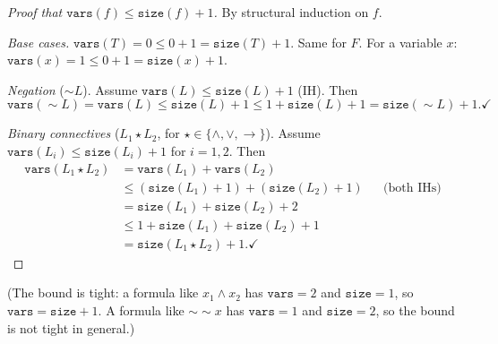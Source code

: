 \documentclass[11pt]{article}
\begin{document}
\begin{proof}[Proof that $\texttt{vars}(f) \leq \texttt{size}(f) + 1$]
By structural induction on $f$.

\emph{Base cases.} $\texttt{vars}(T) = 0 \leq 0 + 1 = \texttt{size}(T) + 1$. Same for $F$. For a variable $x$: $\texttt{vars}(x) = 1 \leq 0 + 1 = \texttt{size}(x) + 1$. \checkmark

\emph{Negation} (${\sim} L$). Assume $\texttt{vars}(L) \leq \texttt{size}(L) + 1$ (IH). Then
\[
  \texttt{vars}({\sim} L) = \texttt{vars}(L) \leq \texttt{size}(L) + 1 \leq 1 + \texttt{size}(L) + 1 = \texttt{size}({\sim} L) + 1. \checkmark
\]

\emph{Binary connectives} ($L_1 \star L_2$, for $\star \in \{\wedge, \vee, \to\}$). Assume $\texttt{vars}(L_i) \leq \texttt{size}(L_i) + 1$ for $i = 1, 2$. Then
\begin{align*}
  \texttt{vars}(L_1 \star L_2) &= \texttt{vars}(L_1) + \texttt{vars}(L_2) \\
    &\leq (\texttt{size}(L_1) + 1) + (\texttt{size}(L_2) + 1) && \text{(both IHs)} \\
    &= \texttt{size}(L_1) + \texttt{size}(L_2) + 2 \\
    &\leq 1 + \texttt{size}(L_1) + \texttt{size}(L_2) + 1 \\
    &= \texttt{size}(L_1 \star L_2) + 1. \checkmark
\end{align*}
\end{proof}

(The bound is tight: a formula like $x_1 \wedge x_2$ has $\texttt{vars} = 2$ and $\texttt{size} = 1$, so $\texttt{vars} = \texttt{size} + 1$. A formula like ${\sim}{\sim}x$ has $\texttt{vars} = 1$ and $\texttt{size} = 2$, so the bound is not tight in general.)
\end{document}
